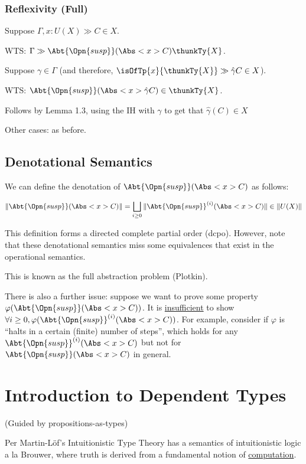 \documentclass[letterpaper]{article}
\newcommand{\rSuspEx}[2]{\Abt{\Opn{susp}}(\Abs<#1>{#2})}
\newcommand{\rkSuspEx}[3]{\Abt{\Opn{susp}}^{(#1)}(\Abs<#2>{#3})}
\begin{document}
\subsubsection{Reflexivity (Full)}

\begin{theorem}[Reflexivity]
    \textnormal{Suppose $\Gamma, x : U(X) \gg C \in X$.}

    \textnormal{WTS: $\Gamma \gg \rSuspEx{x}{C}{\thunkTy{X}}$.}

    \textnormal{Suppose $\gamma \in \Gamma$ (and therefore, $\isOfTp{x}{\thunkTy{X}} \gg \hat{\gamma}C \in X$).}

    \textnormal{WTS: $\rSuspEx{x}{\hat{\gamma}C} \in \thunkTy{X}$.}

    \textnormal{Follows by Lemma 1.3, using the IH with $\gamma$ to get that $\hat{\gamma}(C) \in X$}

    \textnormal{Other cases: as before.}

\end{theorem}

\subsection{Denotational Semantics}

We can define the denotation of $\rSuspEx{x}{C}$ as follows:

\[ \Vert \rSuspEx{x}{C} \Vert = \bigsqcup_{i \geq 0} \Vert \rkSuspEx{i}{x}{C} \Vert \in \Vert U(X) \Vert \]

This definition forms a directed complete partial order (dcpo). However, note that these denotational semantics miss some equivalences that exist in the operational semantics.

This is known as the full abstraction problem (Plotkin).

There is also a further issue: suppose we want to prove some property $\varphi(\rSuspEx{x}{C})$.
It is \underline{insufficient} to show $\forall i \geq 0, \varphi(\rkSuspEx{i}{x}{C})$. For example, consider if $\varphi$ is ``halts in a certain (finite) number of steps'', which holds for any $\rkSuspEx{i}{x}{C}$ but not for $\rSuspEx{x}{C}$ in general.

\section{Introduction to Dependent Types}
(Guided by propositions-as-types)

Per Martin-Löf's Intuitionistic Type Theory has a semantics of intuitionistic logic a la Brouwer, where truth is derived from a fundamental notion of \underline{computation}.
\end{document}
